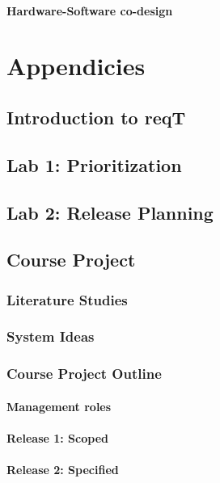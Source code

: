 \documentclass{reqengbook}
\begin{document}
\subsection{Hardware-Software co-design}

\part{Appendicies}\appendix

\chapter{Introduction to reqT}

\chapter{Lab 1: Prioritization}

\chapter{Lab 2: Release Planning}

\chapter{Course Project}

\section{Literature Studies}

\section{System Ideas}

\section{Course Project Outline}
\subsection{Management roles}
\subsection{Release 1: Scoped}
\subsection{Release 2: Specified}
\end{document}
